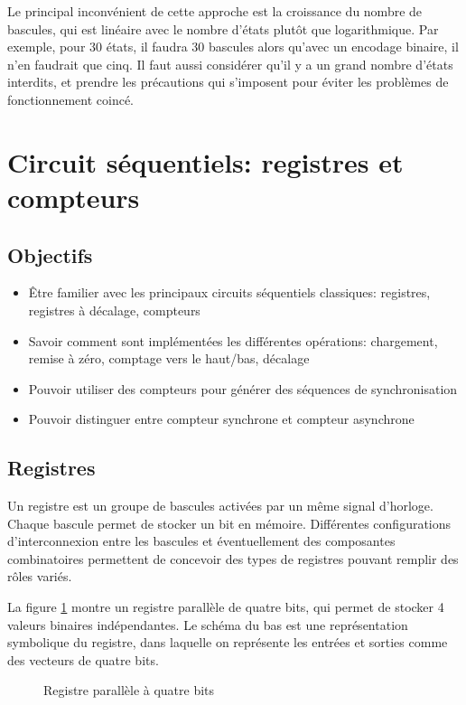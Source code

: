 \documentclass[11pt]{article}
\begin{document}
Le principal inconvénient de cette approche est la croissance du
nombre de bascules, qui est linéaire avec le nombre d'états plutôt que
logarithmique. Par exemple, pour 30 états, il faudra 30 bascules alors
qu'avec un encodage binaire, il n'en faudrait que cinq. Il faut aussi
considérer qu'il y a un grand nombre d'états interdits, et prendre les
précautions qui s'imposent pour éviter les problèmes de fonctionnement
coincé.


\section{Circuit séquentiels: registres et compteurs}
\label{sec:org5131b17}
\subsection{Objectifs}
\label{sec:org5cf8571}
\begin{itemize}
\item Être familier avec les principaux circuits séquentiels classiques:
registres, registres à décalage, compteurs
\item Savoir comment sont implémentées les différentes opérations:
chargement, remise à zéro, comptage vers le haut/bas, décalage
\item Pouvoir utiliser des compteurs pour générer des séquences de
synchronisation
\item Pouvoir distinguer entre compteur synchrone et compteur asynchrone
\end{itemize}

\subsection{Registres}
\label{sec:org3f95870}

Un registre est un groupe de bascules activées par un même signal
d'horloge. Chaque bascule permet de stocker un bit en
mémoire. Différentes configurations d'interconnexion entre les
bascules et éventuellement des composantes combinatoires permettent de
concevoir des types de registres pouvant remplir des rôles variés.

La figure \ref{fig:orgb6dd8da} montre un registre parallèle de quatre bits,
qui permet de stocker 4 valeurs binaires indépendantes. Le schéma du
bas est une représentation symbolique du registre, dans laquelle on
représente les entrées et sorties comme des vecteurs de quatre bits.

\begin{figure}[htbp]
\centering

\caption{\label{fig:orgb6dd8da}Registre parallèle à quatre bits}
\end{figure}
\end{document}
